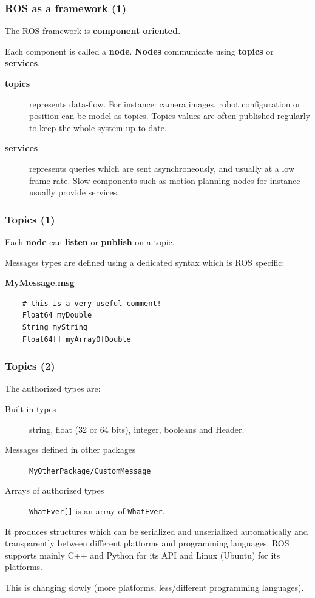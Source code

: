 \documentclass[hyperref={pdfpagelabels=false}]{beamer}
\begin{document}
\begin{frame}
  \frametitle{ROS as a framework (1)}

  The ROS framework is \textbf{component oriented}.

  Each component is called a \textbf{node}. \textbf{Nodes} communicate
  using \textbf{topics} or \textbf{services}.

  \begin{description}
    \item[\textbf{topics}] represents data-flow. For instance: camera
      images, robot configuration or position can be model as topics.
      Topics values are often published regularly to keep the whole
      system up-to-date.

    \item[\textbf{services}] represents queries which are sent
      asynchroneously, and usually at a low frame-rate. Slow
      components such as motion planning nodes for instance usually
      provide services.
  \end{description}
\end{frame}

\begin{frame}[fragile]
  \frametitle{Topics (1)}

  Each \textbf{node} can \textbf{listen} or \textbf{publish} on a
  topic.

  Messages types are defined using a dedicated syntax which is ROS
  specific:

  \textbf{MyMessage.msg}
  \begin{verbatim}
    # this is a very useful comment!
    Float64 myDouble
    String myString
    Float64[] myArrayOfDouble
  \end{verbatim}
\end{frame}


\begin{frame}[fragile]
  \frametitle{Topics (2)}
  The authorized types are:
  \begin{description}
    \item[Built-in types] string, float (32 or 64 bits), integer,
      booleans and Header.
    \item[Messages defined in other packages]
      \texttt{MyOtherPackage/CustomMessage}
    \item[Arrays of authorized types] \texttt{WhatEver[]} is an array
      of \texttt{WhatEver}.
  \end{description}

  \vspace{0.3cm}

  It produces structures which can be serialized and unserialized
  automatically and transparently between different platforms and
  programming languages. ROS supports mainly C++ and Python for its
  API and Linux (Ubuntu) for its platforms.

  \vspace{0.1cm}

  This is changing slowly (more platforms, less/different programming
  languages).
\end{frame}
\end{document}
